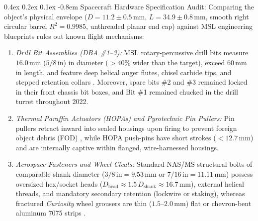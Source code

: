 \documentclass[11pt,a4paper]{article}
\makeatletter
\renewcommand\paragraph{\@startsection{paragraph}{4}{\z@}%
                                    {0.4ex \@plus 0.2ex \@minus 0.1ex}%
                                    {-0.8em}%
                                    {\normalfont\normalsize\bfseries}}
\makeatother
\begin{document}
\paragraph{Spacecraft Hardware Specification Audit:} Comparing the object's physical envelope ($D = 11.2 \pm 0.5\,\text{mm}$, $L = 34.9 \pm 0.8\,\text{mm}$, smooth right circular barrel $R^2 = 0.9985$, unthreaded planar end cap) against MSL engineering blueprints rules out known flight mechanisms:
\begin{enumerate}
	\item \textit{Drill Bit Assemblies (DBA \#1--3):} MSL rotary-percussive drill bits measure $16.0\,\text{mm}$ ($5/8\,\text{in}$) in diameter ($>40\%$ wider than the target), exceed $60\,\text{mm}$ in length, and feature deep helical auger flutes, chisel carbide tips, and stepped retention collars \cite{anderson2012,okon2010}. Moreover, spare bits \#2 and \#3 remained locked in their front chassis bit boxes, and Bit \#1 remained chucked in the drill turret throughout 2022.
	\item \textit{Thermal Paraffin Actuators (HOPAs) and Pyrotechnic Pin Pullers:} Pin pullers retract inward into sealed housings upon firing to prevent foreign object debris (FOD) \cite{bement1995}, while HOPA push-pins have short strokes ($<12.7\,\text{mm}$) and are internally captive within flanged, wire-harnessed housings.
	\item \textit{Aerospace Fasteners and Wheel Cleats:} Standard NAS/MS structural bolts of comparable shank diameter ($3/8\,\text{in} = 9.53\,\text{mm}$ or $7/16\,\text{in} = 11.11\,\text{mm}$) possess oversized hex/socket heads ($D_{\text{head}} \approx 1.5\,D_{\text{shank}} \approx 16.7\,\text{mm}$), external helical threads, and mandatory secondary retention (lockwire or staking), whereas fractured \textit{Curiosity} wheel grousers are thin ($1.5\text{--}2.0\,\text{mm}$) flat or chevron-bent aluminum 7075 strips \cite{arvidson2017,toupet2020}.
\end{enumerate}
\end{document}
